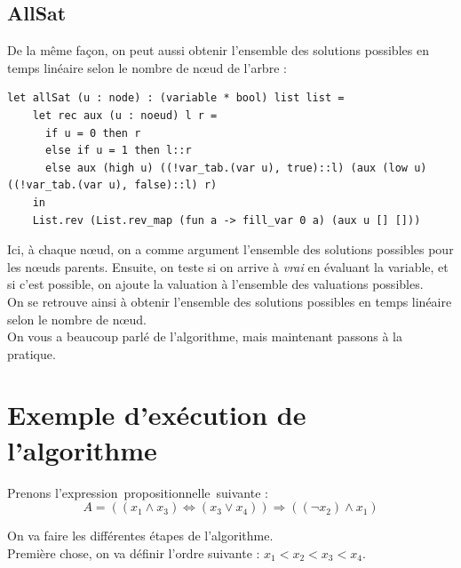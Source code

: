 \documentclass[a4paper, oneside]{report}
\newcommand{\expp}{expression~propositionnelle~}
\begin{document}
\subsection{AllSat}

De la même façon, on peut aussi obtenir l'ensemble des solutions possibles en temps linéaire selon le nombre de nœud de l'arbre :
\begin{lstlisting}
let allSat (u : node) : (variable * bool) list list =
    let rec aux (u : noeud) l r =
      if u = 0 then r
      else if u = 1 then l::r
      else aux (high u) ((!var_tab.(var u), true)::l) (aux (low u) ((!var_tab.(var u), false)::l) r)
    in 
    List.rev (List.rev_map (fun a -> fill_var 0 a) (aux u [] []))
\end{lstlisting}
Ici, à chaque nœud, on a comme argument l'ensemble des solutions possibles pour les nœuds parents. Ensuite, on teste si on arrive à \textit{vrai} en évaluant la variable, et si c'est possible, on ajoute la valuation à l'ensemble des valuations possibles.\\
On se retrouve ainsi à obtenir l'ensemble des solutions possibles en temps linéaire selon le nombre de nœud.\\

On vous a beaucoup parlé de l'algorithme, mais maintenant passons à la pratique.

\section{Exemple d'exécution de l'algorithme}

Prenons l'\expp suivante :
$$A = ((x_1 \wedge x_3) \Leftrightarrow (x_3 \vee x_4)) \Rightarrow ((\neg x_2) \wedge x_1)$$

On va faire les différentes étapes de l'algorithme.\\
Première chose, on va définir l'ordre suivante : $x_1 < x_2 < x_3 < x_4$.

\newcommand{\largeur}{0.5\linewidth}
\end{document}
